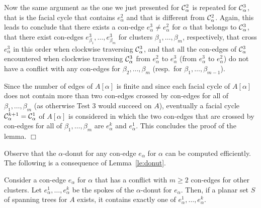 \documentclass[letter,runningheads]{llncs}
\renewenvironment{proof}
{{\em Proof.\ }}{\hspace*{\fill}$\Box$\par\vspace{2mm}}
\begin{document}
\begin{proof}
Now the same argument as the one we just presented for ${\cal C}^2_{\alpha}$ is repeated for ${\cal C}^3_{\alpha}$, that is the facial cycle that contains $e^2_{\alpha}$ and that is different from ${\cal C}^2_{\alpha}$. Again, this leads to conclude that there exists a con-edge $e^3_{\alpha}\neq e^2_{\alpha}$ for $\alpha$ that belongs to ${\cal C}^3_{\alpha}$, that there exist con-edges $e^3_{\beta_1},\dots,e^3_{\beta_m}$ for clusters $\beta_1,\dots,\beta_m$, respectively, that cross $e^3_{\alpha}$ in this order when clockwise traversing ${\cal C}^3_{\alpha}$, and that all the con-edges of ${\cal C}^3_{\alpha}$ encountered when clockwise traversing ${\cal C}^3_{\alpha}$ from $e^2_{\alpha}$ to $e^3_{\alpha}$ (from $e^3_{\alpha}$ to $e^2_{\alpha}$) do not have a conflict with any con-edges for $\beta_2,\dots,\beta_m$ (resp.\ for $\beta_1,\dots,\beta_{m-1}$).

Since the number of edges of $A[\alpha]$ is finite and since each facial cycle of $A[\alpha]$ does not contain more than two con-edges crossed by con-edges for all of $\beta_1,\dots,\beta_m$ (as otherwise {\sc Test 3} would succeed on $A$), eventually a facial cycle ${\cal C}^{k+1}_{\alpha}={\cal C}^{1}_{\alpha}$ of $A[\alpha]$ is considered in which the two con-edges that are crossed by con-edges for all of $\beta_1,\dots,\beta_m$ are $e^k_{\alpha}$ and $e^1_{\alpha}$. This concludes the proof of the lemma.
\end{proof}

Observe that the $\alpha$-donut for any con-edge $e_{\alpha}$ for $\alpha$ can be computed efficiently. The following is a consequence of Lemma~\ref{le:donut}.

\begin{lemma} \label{le:exactly-one}
Consider a con-edge $e_{\alpha}$ for $\alpha$ that has a conflict with $m\geq 2$ con-edges for other clusters. Let $e^1_\alpha,\dots,e^{k}_\alpha$ be the spokes of the $\alpha$-donut for $e_{\alpha}$. Then, if a planar set $S$ of spanning trees for $A$ exists, it contains exactly one of $e^1_\alpha,\dots,e^{k}_\alpha$.
\end{lemma}
\end{document}
